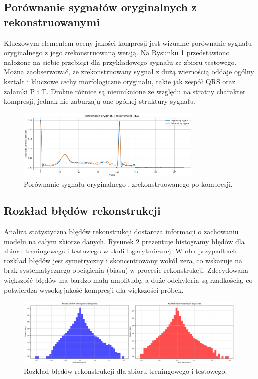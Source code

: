 \documentclass[12pt,a4paper]{article}
\begin{document}
\subsection{Porównanie sygnałów oryginalnych z rekonstruowanymi}

Kluczowym elementem oceny jakości kompresji jest wizualne porównanie sygnału oryginalnego z jego zrekonstruowaną wersją. Na Rysunku \ref{fig:reconstruction_comparison} przedstawiono nałożone na siebie przebiegi dla przykładowego sygnału ze zbioru testowego. Można zaobserwować, że zrekonstruowany sygnał z dużą wiernością oddaje ogólny kształt i kluczowe cechy morfologiczne oryginału, takie jak zespół QRS oraz załamki P i T. Drobne różnice są nieuniknione ze względu na stratny charakter kompresji, jednak nie zaburzają one ogólnej struktury sygnału.

\begin{figure}[H]
    \centering
    \includegraphics[width=0.8\textwidth]{reconstruction_comparison.png}
    \caption{Porównanie sygnału oryginalnego i zrekonstruowanego po kompresji.}
    \label{fig:reconstruction_comparison}
\end{figure}

\subsection{Rozkład błędów rekonstrukcji}

Analiza statystyczna błędów rekonstrukcji dostarcza informacji o zachowaniu modelu na całym zbiorze danych. Rysunek \ref{fig:error_distribution} prezentuje histogramy błędów dla zbioru treningowego i testowego w skali logarytmicznej. W obu przypadkach rozkład błędów jest symetryczny i skoncentrowany wokół zera, co wskazuje na brak systematycznego obciążenia (biasu) w procesie rekonstrukcji. Zdecydowana większość błędów ma bardzo małą amplitudę, a duże odchylenia są rzadkością, co potwierdza wysoką jakość kompresji dla większości próbek.

\begin{figure}[H]
    \centering
    \includegraphics[width=\textwidth]{error_distribution.png}
    \caption{Rozkład błędów rekonstrukcji dla zbioru treningowego i testowego.}
    \label{fig:error_distribution}
\end{figure}
\end{document}
